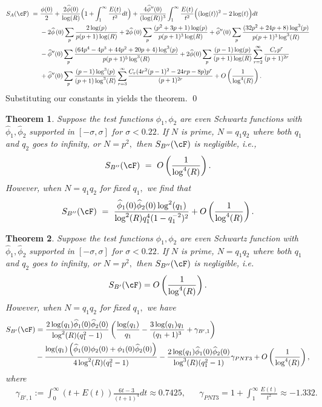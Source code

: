 \documentclass[11pt, reqno]{amsart}
\newtheorem{theorem}{Theorem}[section]
\theoremstyle{definition}
\theoremstyle{remark}
\numberwithin{equation}{section}
\renewcommand{\hat}{\widehat}
\begin{document}
\small\begin{align}
    S_A(\cF)\ =\ &\frac{\phi(0)}{2}
    +\frac{2\hat\phi(0)}{\log(R)}\Bigl(1+\int_{1}^{\infty}\frac{E(t)}{t^{2}}dt\Bigr)+\frac{4\hat\phi''(0)}{(\log(R))^{3}}
\int_{1}^{\infty}\frac{E(t)}{t^{2}}\Bigl((\log(t))^{2}-2\log(t)\Bigr)dt\nonumber\\
        &-2\hat{\phi}\left(0 \right)\sum_p\frac{2\log(p)}{p(p+1)\log(R)}+2\hat{\phi}\left(0 \right) \sum_p\frac{(p^2+3p+1)\log(p)}{p(p+1)^3 \log(R)}+\hat{\phi}''(0)\sum_p\frac{(32p^2+24p+8)\log^3(p)}{p(p+1)^3\log^3(R)}\nonumber\\
        &-\hat{\phi}''(0)\sum_p\frac{(64p^4-4p^3+44p^2+20p+4)\log^3(p)}{p(p+1)^5\log^3(R)}+2\hat\phi(0)\sum_p\frac{(p-1)\log(p)}{(p+1)\log(R)}\sum_{r=2}^{\infty}\frac{C_rp^{r}}{(p+1)^{2r}}\nonumber\\
        &+\hat\phi''(0)\sum_p\frac{(p-1)\log^3(p)}{(p+1)\log^3(R)}\sum_{r=3}^{\infty}\frac{C_r (4r^2(p-1)^2-24rp-8p)p^{r}}{(p+1)^{2r}}+ O\left(\frac{1}{\log^4(R)} \right).
\end{align}\normalsize Substituting our constants in yields the theorem. \qed

\begin{theorem}\label{thm:S_B''} Suppose the test functions $\phi_1,\phi_2$ are even Schwartz functions with $\hat\phi_1, \hat\phi_2$ supported in $[-\sigma,\sigma]$ for $\sigma<0.22$.
    If $N$ is prime, $N=q_1q_2$ where both $q_1 $ and $q_2$ goes to infinity, or $N=p^2,$ then $S_{B''}(\cF)$ is negligible, i.e., $$S_{B''}(\cF)\ =\ O\left(\frac{1}{\log^4(R)}\right).$$
    However, when $N = q_1q_2$ for fixed $q_1,$ we find that
    \begin{align}
S_{B''}(\cF)\ =\ \frac{\hat\phi_1(0)\hat\phi_2(0)\log^2(q_1)}{\log^2(R)q_1^4(1-q_1^{-2})^2}  + O\left(\frac{1}{\log^4(R)}\right).
    \end{align}
\end{theorem}

\begin{theorem}\label{thm:S_B'}Suppose the test functions $\phi_1,\phi_2$ are even Schwartz function with $\hat\phi_1, \hat\phi_2$ supported in $[-\sigma,\sigma]$ for $\sigma<0.22$.
  If $N$ is prime, $N=q_1q_2$ where both $q_1 $ and $q_2$ goes to infinity, or $N=p^2,$ then $S_{B''}(\cF)$ is negligible, i.e. $$S_{B'}(\cF) = O\left(\frac{1}{\log^4(R)}\right).$$
    However, when $N = q_1q_2$ for fixed $q_1,$ we have
\begin{align}
S_{B'}(\cF)
&= \frac{2\log(q_1)\hat\phi_1(0)\hat\phi_2(0)}{\log^2(R)(q_1^2-1)}\left(\frac{\log(q_1)}{q_1}-\frac{3\log(q_1)q_1}{(q_1+1)^3} + \gamma_{B',1}\right)\notag\\&- 
\frac{\log(q_1)\left(\hat\phi_1(0)\phi_2(0) + \phi_1(0)\hat\phi_2(0)\right)}{4\log^2(R)(q_1^2-1)} -\frac{2\log(q_1)\hat\phi_1(0)\hat\phi_2(0)}{\log^3(R)(q_1^2-1)}\gamma_{PNT3} + O\left(\frac{1}{\log^4(R)}\right),
\end{align}
where \begin{align}
   & \gamma_{B',1} := \int_0^\infty (t+E(t))\frac{6t-3}{(t+1)^4}dt\approx 0.7425,
    &&\gamma_{PNT3} = 1+\int_1^\infty \frac{E(t)}{t^2} \approx -1.332.
\end{align}\end{theorem}
\end{document}

